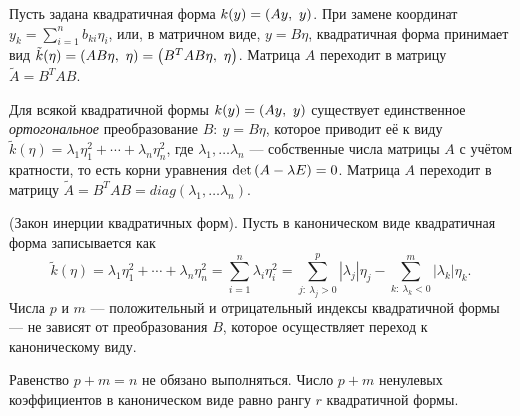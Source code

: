     \begin{theorem}
        Пусть задана квадратичная форма $k(y) = \left({Ay,\ y}\right)$. При замене координат $y_k = \sum_{i=1}^n b_{ki}\eta_i$, или, в матричном виде,
        $y = B\eta$, квадратичная форма принимает вид $\tilde{k}(\eta) = \left({AB\eta,\ \eta}\right) = \left({B^T AB\eta,\ \eta}\right)$. Матрица $A$ переходит
        в матрицу $\tilde{A} = B^T AB$.
    \end{theorem}

    \begin{theorem}
        Для всякой квадратичной формы $k(y) = \left({Ay,\ y}\right)$ существует единственное \textit{ортогональное} преобразование $B: \: y = B\eta$, которое
        приводит её к виду $\tilde{k}(\eta) = \lambda_1 \eta_1^2 + \cdots + \lambda_n \eta_n^2$, где $\lambda_1,\ldots\lambda_n$ --- собственные числа
        матрицы $A$ с учётом кратности, то есть корни уравнения $\det \left({A - \lambda E}\right) = 0$. Матрица $A$ переходит в матрицу
        $\tilde{A} = B^T AB = diag(\lambda_1,\ldots\lambda_n)$.
    \end{theorem}


    \begin{theorem}
        (Закон инерции квадратичных форм). Пусть в каноническом виде квадратичная форма записывается как
        \begin{equation*}
            \tilde{k}(\eta) = \lambda_1 \eta_1^2 + \cdots + \lambda_n \eta_n^2 = \sum_{i = 1}^n\lambda_i \eta_i^2 = 
            \sum_{j:\: \lambda_j > 0}^p |\lambda_j| \eta_j - \sum_{k:\: \lambda_k < 0}^m |\lambda_k| \eta_k.
        \end{equation*}
        Числа $p$ и $m$ --- положительный и отрицательный индексы квадратичной формы --- не зависят от преобразования $B$, которое осуществляет
        переход к каноническому виду.
    \end{theorem}
    \begin{note}
        Равенство $p + m = n$ не обязано выполняться. Число $p + m$ ненулевых коэффициентов в каноническом виде равно рангу $r$ квадратичной формы.
    \end{note}
    
